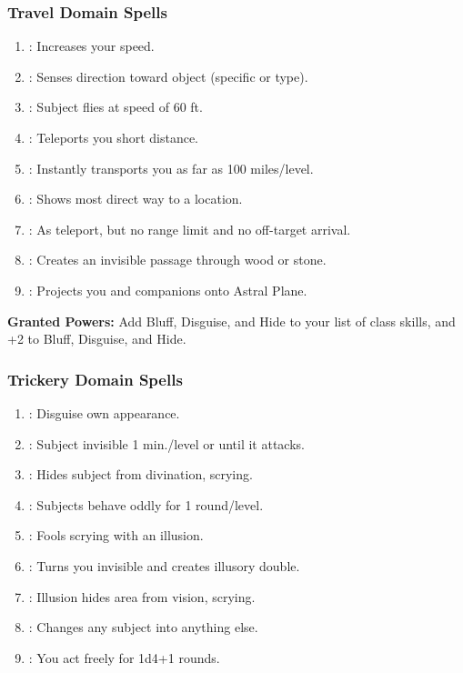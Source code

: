 \subsubsection{Travel Domain Spells}
\begin{enumerate}
	\item{:} Increases your speed.
	\item{:} Senses direction toward object (specific or type).
	\item{:} Subject flies at speed of 60 ft.
	\item{:} Teleports you short distance.
	\item{:} Instantly transports you as far as 100 miles/level.
	\item{:} Shows most direct way to a location.
	\item{:} As teleport, but no range limit and no off-target arrival.
	\item{:} Creates an invisible passage through wood or stone.
	\item{:} Projects you and companions onto Astral Plane.
\end{enumerate}

\textbf{Granted Powers:} Add Bluff, Disguise, and Hide to your list of class skills, and +2 to Bluff, Disguise, and Hide.
\subsubsection{Trickery Domain Spells}
\begin{enumerate}
	\item{:} Disguise own appearance.
	\item{:} Subject invisible 1 min./level or until it attacks.
	\item{:} Hides subject from divination, scrying.
	\item{:} Subjects behave oddly for 1 round/level.
	\item{:} Fools scrying with an illusion.
	\item{:} Turns you invisible and creates illusory double.
	\item{:}  Illusion hides area from vision, scrying.
	\item{:} Changes any subject into anything else.
	\item{:} You act freely for 1d4+1 rounds.
\end{enumerate}

